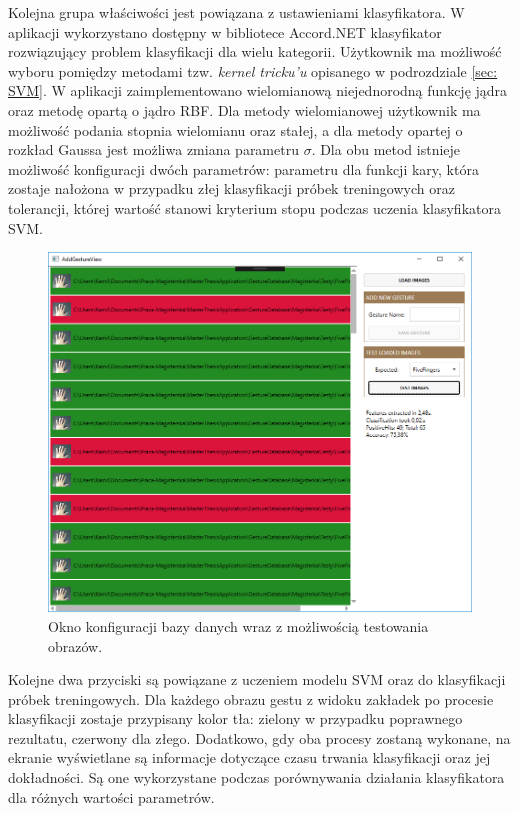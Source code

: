 Kolejna grupa właściwości jest powiązana z ustawieniami klasyfikatora. W aplikacji wykorzystano dostępny w bibliotece Accord.NET klasyfikator rozwiązujący problem klasyfikacji dla wielu kategorii. Użytkownik ma możliwość wyboru pomiędzy metodami tzw. \textit{kernel tricku'u} opisanego w podrozdziale \ref{sec: SVM}. W aplikacji zaimplementowano wielomianową niejednorodną funkcję jądra oraz metodę opartą o jądro RBF. Dla metody wielomianowej użytkownik ma możliwość podania stopnia wielomianu oraz stałej, a dla metody opartej o rozkład Gaussa jest możliwa zmiana parametru $\sigma$. Dla obu metod istnieje możliwość konfiguracji dwóch parametrów: parametru dla funkcji kary, która zostaje nałożona w przypadku złej klasyfikacji próbek treningowych oraz tolerancji, której wartość stanowi kryterium stopu podczas uczenia klasyfikatora SVM. 

\begin{figure}[h!]
	\centering
	\includegraphics[width=16cm]{ManageDatabaseWindow}
	\centering
	\caption{Okno konfiguracji bazy danych wraz z możliwością testowania obrazów.}
	\label{im: ManageDatabaseWindow}
\end{figure}

Kolejne dwa przyciski są powiązane z uczeniem modelu SVM oraz do klasyfikacji próbek treningowych.  Dla każdego obrazu gestu z widoku zakładek po procesie klasyfikacji zostaje przypisany kolor tła: zielony w przypadku poprawnego rezultatu, czerwony dla złego. Dodatkowo, gdy oba procesy zostaną wykonane, na ekranie wyświetlane są informacje dotyczące czasu trwania klasyfikacji oraz jej dokładności. Są one wykorzystane podczas porównywania działania klasyfikatora dla różnych wartości parametrów.

